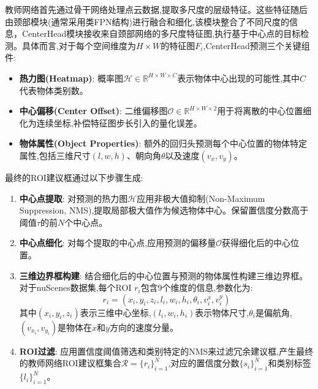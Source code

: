 \documentclass[12pt, UTF8]{ctexart}
\begin{document}
教师网络首先通过骨干网络处理点云数据,提取多尺度的层级特征。这些特征随后由颈部模块(通常采用类FPN结构)进行融合和细化,该模块整合了不同尺度的信息，CenterHead模块接收来自颈部网络的多尺度特征图,执行基于中心点的目标检测。具体而言,对于每个空间维度为$H \times W$的特征图$F_i$,CenterHead预测三个关键组件:

\begin{itemize}
    \item \textbf{热力图(Heatmap)}: 概率图$\mathcal{H} \in \mathbb{R}^{H \times W \times C}$表示物体中心出现的可能性,其中$C$代表物体类别数。
    \item \textbf{中心偏移(Center Offset)}: 二维偏移图$\mathcal{O} \in \mathbb{R}^{H \times W \times 2}$用于将离散的中心位置细化为连续坐标,补偿特征图步长引入的量化误差。
    \item \textbf{物体属性(Object Properties)}: 额外的回归头预测每个中心位置的物体特定属性,包括三维尺寸$(l, w, h)$、朝向角$\theta$以及速度$(v_x, v_y)$。
\end{itemize}

最终的ROI建议框通过以下步骤生成:

\begin{enumerate}
    \item \textbf{中心点提取}: 对预测的热力图$\mathcal{H}$应用非极大值抑制(Non-Maximum Suppression, NMS),提取局部极大值作为候选物体中心。保留置信度分数高于阈值$\tau$的前$N$个中心点。
    
    \item \textbf{中心点细化}: 对每个提取的中心点,应用预测的偏移量$\mathcal{O}$获得细化后的中心位置。
    
    \item \textbf{三维边界框构建}: 结合细化后的中心位置与预测的物体属性构建三维边界框。对于nuScenes数据集,每个ROI $r_i$包含9个维度的信息,参数化为:
    \begin{equation}
        r_i = (x_i, y_i, z_i, l_i, w_i, h_i, \theta_i, v_{i}^x, v_{i}^y)
    \end{equation}
    其中$(x_i, y_i, z_i)$表示三维中心坐标,$(l_i, w_i, h_i)$表示物体尺寸,$\theta_i$是偏航角,$(v_{x_i}, v_{y_i})$是物体在$x$和$y$方向的速度分量。
    
    \item \textbf{ROI过滤}: 应用置信度阈值筛选和类别特定的NMS来过滤冗余建议框,产生最终的教师网络ROI建议框集合$\mathcal{R} = \{r_i\}_{i=1}^{N}$,对应的置信度分数$\{s_i\}_{i=1}^{N}$和类别标签$\{l_i\}_{i=1}^{N}$。
\end{enumerate}
\end{document}
